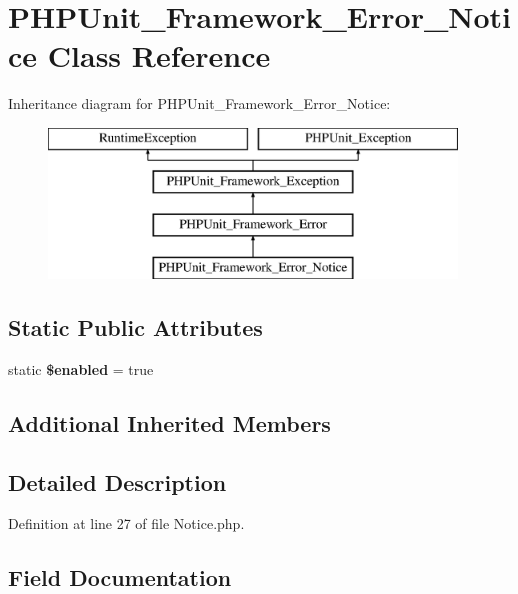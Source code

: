 \section{P\+H\+P\+Unit\+\_\+\+Framework\+\_\+\+Error\+\_\+\+Notice Class Reference}
\label{class_p_h_p_unit___framework___error___notice}
Inheritance diagram for P\+H\+P\+Unit\+\_\+\+Framework\+\_\+\+Error\+\_\+\+Notice\+:\begin{figure}[H]
\begin{center}
\leavevmode
\includegraphics[height=4.000000cm]{class_p_h_p_unit___framework___error___notice}
\end{center}
\end{figure}
\subsection*{Static Public Attributes}
\begin{DoxyCompactItemize}
\item 
static {\bf \$enabled} = true
\end{DoxyCompactItemize}
\subsection*{Additional Inherited Members}


\subsection{Detailed Description}


Definition at line 27 of file Notice.\+php.



\subsection{Field Documentation}
